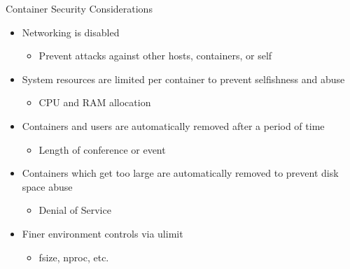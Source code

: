 \documentclass[xcolor=svgnames,handout]{beamer}
\begin{document}
\begin{frame}{Container Security Considerations}
  \begin{itemize}
    \item Networking is disabled
	\begin{itemize}
		\item Prevent attacks against other hosts, containers, or self
	\end{itemize}
    \item System resources are limited per container to prevent selfishness and abuse
	\begin{itemize}
		\item CPU and RAM allocation
	\end{itemize}
    \item Containers and users are automatically removed after a period of time
	\begin{itemize}
		\item Length of conference or event
	\end{itemize}
    \item Containers which get too large are automatically removed to prevent disk space abuse
	\begin{itemize}
		\item Denial of Service
	\end{itemize}
    \item Finer environment controls via ulimit
	\begin{itemize}
		\item fsize, nproc, etc.
	\end{itemize}
  \end{itemize}
\end{frame}
\end{document}
